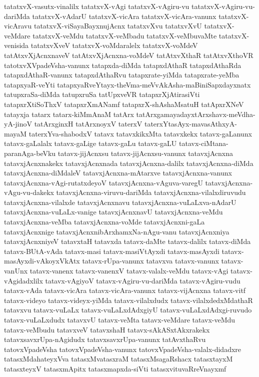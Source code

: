 {tatatxvX-vasutx-vinalilx
tatatxvX-vAgi
tatatxvX-vAgiru-vu
tatatxvX-vAgiru-vu-dariMda
tatatxvX-vAdarU
tatatxvX-vicAra
tatatxvX-vicAra-vanunx
tatatxvX-vicAravu
tatatxvX-viSayaBayxnujAcnx
tatatxvXvu
tatatxvXvU
tatatxvX-veMdare
tatatxvX-veMdu
tatatxvX-veMbadu
tatatxvX-veMbuvaMte
tatatxvX-venisida
tatatxvXveV
tatatxvX-voMdaralelx
tatatxvX-voMdeV
tatAtxvXjAcnxnaveV
tatAtxvXjAcnxna-voMdeV
tatAtxvXthaR
tatAtxvXthoVR
tatotxvXVpadeVsha-vanunx
tatapxda-diMda
tatapxdAthaR
tatapxdAthaRda
tatapxdAthaR-vanunx
tatapxdAthaRvu
tatapxrate-yiMda
tatapxrate-yeMba
tatapxyaR-veYti
tatapxyaRveYtayx-theVma-meVvAkAsha-maBiniSapxdayxnatx
tatupxraSa-diMda
tatupxruSa
tatUpxveVR
tatapxrXjAtirasiVti
tatapxrXtiSoThxV
tatapxrXmANamf
tatapxrX-shAshaMsatuH
tatApxrXNeV
tatayxja
tatarx
tatarx-kiMmAnaM
tatArx
tatArxgamayadayxtArxshavx-meVdha-yA-jinoV
tatArxginxH
tatArxnoyxV
taterxV
taterxYtasAyx-mavasAthxyA-mayaM
taterxYva-shabodxV
tatavx
tatavxkikxMta
tatavxkekx
tatavx-gaLanunx
tatavx-gaLalalx
tatavx-gaLige
tatavx-gaLu
tatavx-gaLU
tatavx-ciMtana-paranAga-beVku
tatavx-jijAcnxsu
tatavx-jijAcnxsu-vanunx
tatavxjAcnxna
tatavxjAcnxnakekx
tatavxjAcnxnada
tatavxjAcnxna-dalilx
tatavxjAcnxna-diMda
tatavxjAcnxna-diMdaleV
tatavxjAcnxna-mAtarxve
tatavxjAcnxna-vanunx
tatavxjAcnxna-vAgi-rutatxdeyoV
tatavxjAcnxna-vAguva-varegU
tatavxjAcnxna-vAgu-vu-dakekx
tatavxjAcnxna-viruvu-dariMda
tatavxjAcnxna-vilalxdiruvudu
tatavxjAcnxna-vilalxde
tatavxjAcnxnavu
tatavxjAcnxna-vuLaLxva-nAdarU
tatavxjAcnxna-vuLaLx-vanige
tatavxjAcnxnavU
tatavxjAcnxna-veMdu
tatavxjAcnxna-veMba
tatavxjAcnxna-voMde
tatavxjAcnxni-gaLa
tatavxjAcnxnige
tatavxjAcnxnibArxhamxNa-nAgu-vanu
tatavxjAcnxniya
tatavxjAcnxniyeV
tatavxtaH
tatavxda
tatavx-daMte
tatavx-dalilx
tatavx-diMda
tatavx-BUtA-vAda
tatavx-masi
tatavx-masiVtAyxdi
tatavx-masAyxdi
tatavx-masAyxdi-vAkoyxVkAtx
tatavx-rUpa-vanunx
tatavxva
tatavx-vanunx
tatavx-vanUnx
tatavx-vanenx
tatavx-vanenxV
tatavx-valalx-veMdu
tatavx-vAgi
tatavx-vAgidadxlilx
tatavx-vAgiyoV
tatavx-vAgiru-vu-dariMda
tatavx-vAgiru-vudu
tatavx-vAda
tatavx-vicAra
tatavx-vicAra-vanunx
tatavx-vijAcnxna
tatavx-vitf
tatavx-videyo
tatavx-videyx-yiMda
tatavx-vilalxdudx
tatavx-vilalxdedxMdathaR
tatavxvu
tatavx-vuLaLx
tatavx-vuLaLxdAdxgiyU
tatavx-vuLaLxdAdxgi-ruvudo
tatavx-vuLaLxdudx
tatavxvU
tatavx-veMta
tatavx-veMdare
tatavx-veMdu
tatavx-veMbudu
tatavxveV
tatavxshaH
tatavx-sAkASxtAkxrakekx
tatavxsavxrUpa-nAgidudx
tatavxsavxrUpa-vanunx
tatAvxthaRvu
tatovxVpadeVsha
tatovxVpadeVsha-vanunx
tatovxVpadeVsha-valalx-didadxre
tatasxMdahateyxVva
tatasxMvatasxraM
tatasxMsagaRshacx
tatasxtayxM
tatasxteyxV
tatasxmApitx
tatasxmapxda-siVti
tatasxvituvaRreVnayxmf
}
